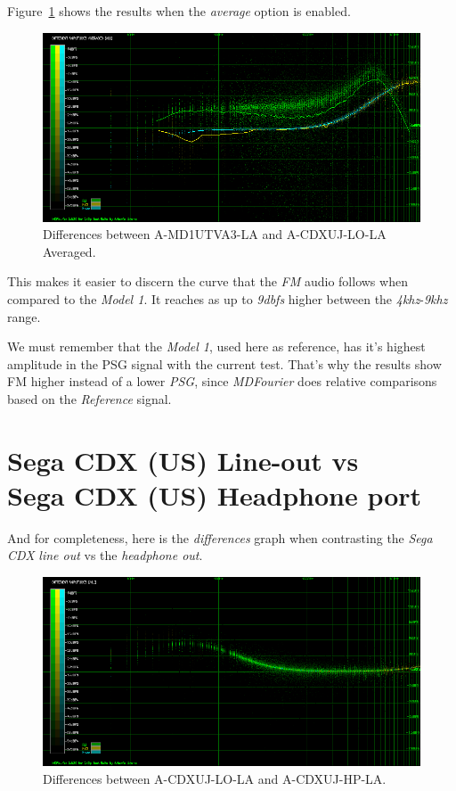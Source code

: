 \documentclass[10pt,a4paper]{report}
\newcommand{\khz}[1]{\textit{\mbox{#1\acrshort{khz}}}}
\newcommand{\db}[1]{\textit{\mbox{#1\acrshort{dbfs}}}}
\begin{document}
Figure~\ref{fig:A-MD1UTVA3-LA_vs_A-CDXUJ-LO-LA_AVG} shows the results when the \textit{average} option is enabled.

\begin{figure}[H]
	\centering
	\includegraphics[width=1.0\linewidth]{images/results/8-A-MD1UTVA3-LA_vs_A-CDXUJ-LO-LA-avg.png}
	\caption[A-MD1UTVA3-LA vs A-CDXUJ-LO-LA AVG]{Differences between A-MD1UTVA3-LA and A-CDXUJ-LO-LA Averaged.}
	\label{fig:A-MD1UTVA3-LA_vs_A-CDXUJ-LO-LA_AVG}
\end{figure}

This makes it easier to discern the curve that the \textit{FM} audio follows when compared to the \textit{Model 1}. It reaches as up to \db{9} higher between the \khz{4}-\khz{9} range.

We must remember that the \textit{Model 1}, used here as reference, has it's highest amplitude in the PSG signal with the current test. That's why the results show FM higher instead of a lower \textit{PSG}, since \textit{MDFourier} does relative comparisons based on the \textit{Reference} signal.

\section{Sega CDX (US) Line-out vs\\ Sega CDX (US) Headphone port}

And for completeness, here is the \textit{differences} graph when contrasting the \textit{Sega CDX} \textit{line out} vs the \textit{headphone out}.

\begin{figure}[H]
	\centering
	\includegraphics[width=1.0\linewidth]{images/results/9-A-CDXUJ-LO-LA_vs_A-CDXUJ-HP-LA.png}
	\caption[A-CDXUJ-LO-LA vs A-CDXUJ-HP-LA]{Differences between A-CDXUJ-LO-LA and A-CDXUJ-HP-LA.}
	\label{fig:A-CDXUJ-LO-LA_vs_A-CDXUJ-HP-LA}
\end{figure}
\end{document}
